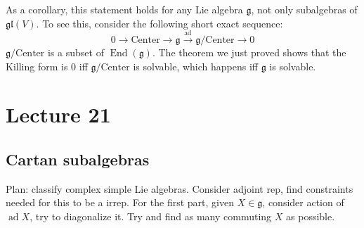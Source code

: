 \documentclass[12 pt]{article}
\DeclareMathOperator {\End} {End}
\DeclareMathOperator {\ad} {ad}
\theoremstyle{plain}
\theoremstyle{definition}
\theoremstyle{remark}
\begin{document}
As a corollary, this statement holds for any Lie algebra $\mathfrak{g}$, not only subalgebras of $\mathfrak{gl}(V)$. To see this, consider the following short exact sequence:
\[        0 \to \text{Center} \to \mathfrak{g} \overset{\text{ad}}{\to} \mathfrak{g}/\text{Center}  \to 0     \]
$\mathfrak{g}/\text{Center}$ is a subset of $\End(\mathfrak{g})$. The theorem we just proved shows that the Killing form is 0 iff $\mathfrak{g}/\text{Center}$ is solvable, which happens iff $\mathfrak{g}$ is solvable.



\section*{Lecture 21}
\subsection*{Cartan subalgebras}
Plan: classify complex simple Lie algebras. Consider adjoint rep, find constraints needed for this to be a irrep. For the first part, given $X\in \mathfrak{g}$, consider action of $\ad X$, try to diagonalize it. Try and find as many commuting $X$ as possible.
\end{document}
